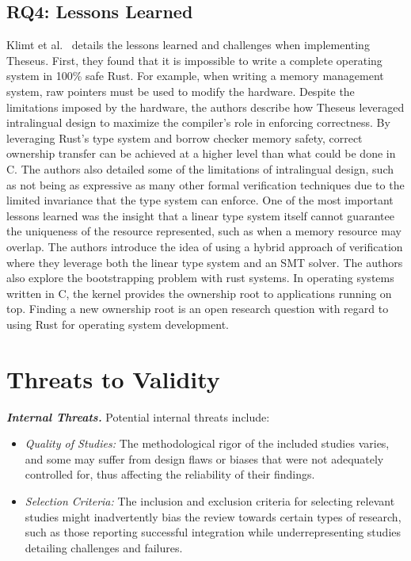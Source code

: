 \documentclass[sigconf]{acmart}
\begin{document}
\subsection{RQ4: Lessons Learned}

Klimt et al.~\cite{Klimt2023-ob} details the lessons learned and challenges when implementing
Theseus. First, they found that it is impossible to write a complete operating system in 100\% safe
Rust. For example, when writing a memory management system, raw pointers must be used to
modify the hardware. Despite the limitations imposed by the hardware, the authors describe how
Theseus leveraged intralingual design to maximize the compiler's role in enforcing correctness. By
leveraging Rust's type system and borrow checker memory safety, correct ownership transfer can be
achieved at a higher level than what could be done in C. The authors also detailed some of the
limitations of intralingual design, such as not being as expressive as many other formal verification
techniques due to the limited invariance that the type system can enforce. One of the most
important lessons learned was the insight that a linear type system itself cannot guarantee
the uniqueness of the resource represented, such as when a memory resource may overlap. The authors
introduce the idea of using a hybrid approach of verification where they leverage both the linear
type system and an SMT solver. The authors also explore the bootstrapping problem with rust
systems. In operating systems written in C, the kernel provides the ownership root to applications running on
top. Finding a new ownership root is an open research question with regard to using Rust for
operating system development.

\section{Threats to Validity}

\textit{\textbf{Internal Threats.}} Potential internal threats include:

\begin{itemize}
  \item \textit{Quality of Studies:} The methodological rigor of the included studies varies, and some may
    suffer from design flaws or biases that were not adequately controlled for, thus affecting the
    reliability of their findings.
  \item  \textit{Selection Criteria:} The inclusion and exclusion criteria for selecting relevant studies might inadvertently bias the review towards certain types of research, such as those reporting successful integration while underrepresenting studies detailing challenges and failures.
\end{itemize}
\end{document}
